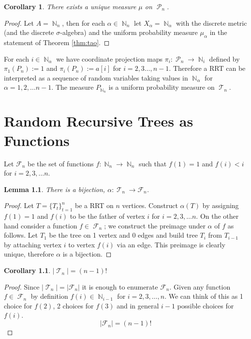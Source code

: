 \documentclass[oneside]{book} %
\newtheorem{lem}[thm]{Lemma}
\newtheorem{cor}[thm]{Corollary}
\theoremstyle{definition}
\numberwithin{equation}{section}
\DeclareMathOperator{\T}{\mathcal{T}}
\DeclareMathOperator{\N}{\mathbb{N}}
\DeclareMathOperator{\Pruf}{\mathcal{P}} %
\DeclareMathOperator{\F}{\mathcal{F}}
\begin{document}
\begin{cor}
 There exists a unique measure $\mu$ on $\Pruf_n$. 
\end{cor}

\begin{proof}
 Let $A = \N_n$, then for each $\alpha \in \N_n$ let $X_\alpha = \N_{\alpha}$ with the discrete metric (and the discrete $\sigma$-algebra) and the uniform probability measure $\mu_{\alpha}$ in the statement of Theorem \ref{thm:tao}.   
\end{proof}

For each $i \in \N_\alpha$ we have coordinate projection maps $\pi_{i} : \Pruf_n \rightarrow \N_i$ defined by $\pi_1(P_n):= 1$ and $\pi_i(P_n):= a[i]$ for $i = 2,3\dots,n-1$.  Therefore a RRT can be interpreted as a sequence of random variables taking values in $\N_{\alpha}$ for $\alpha  = 1,2,\dots n-1$.  The measure $P_{\N_n}$ is a uniform probability measure on $\T_n$.   

\chapter{Random Recursive Trees as Functions}
Let $\mathcal{F}_n$ be the set of functions $f: \N_n \longrightarrow \N_n$ such that $f(1) = 1$ and $f(i) <i$ for $i = 2,3,\dots n$.

\begin{lem}
  There is a bijection, $\alpha: \T_n \rightarrow \mathcal{F}_n$.
\end{lem}

\begin{proof}  Let $T = \{T_t\}_{t=1}^n$ be a RRT on $n$ vertices.  Construct $\alpha(T)$ by assigning $f(1) = 1$ and $f(i)$ 
to be the father of vertex $i$ for $i = 2,3,\dots n$. On the other hand consider a function $f \in \F_n$; we construct the
preimage under $\alpha$ of $f$ as follows. Let $T_1$ be the tree on 1 vertex and 0 edges and build tree $T_i$ from $T_{i-1}$ by attaching vertex $i$ to vertex $f(i)$ via an edge. This preimage is clearly unique, therefore $\alpha$ is a bijection.     
\end{proof}

\begin{cor}
$\lvert \T_n \rvert =  (n-1)!$
\end{cor}
\begin{proof}
 Since $\lvert \T_n \rvert = \lvert \mathcal{F}_n \rvert$ it is enough to enumerate $\mathcal{F}_n$.  
Given any function $f \in \F_n$ by definition $f(i) \in \N_{i-1}$ for $i= 2,3,\dots,n$.  We can think of this as 1 choice for $f(2)$, 
2 choices for $f(3)$ and in general $i-1$ possible choices for $f(i)$.  
\[ \lvert \mathcal{F}_n \rvert = (n-1)!\]
\end{proof}
\end{document}
